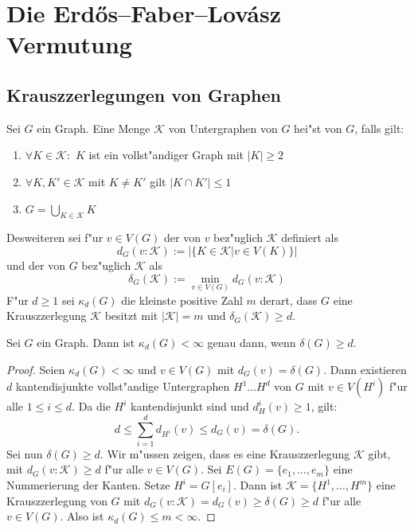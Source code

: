 \section{Die Erd\H{o}s--Faber--Lov\'asz Vermutung}
\label{sec:EFL-Vermutung}


\subsection{Krauszzerlegungen von Graphen}
\label{ssec:Krauszzerlegung}
\begin{definition}
  \label{def:Krauszzerlegung}
  Sei $G$ ein Graph. Eine Menge $\mathcal K$ von Untergraphen von $G$ hei"st  von $G$, falls gilt:
  \begin{enumerate}[label=(\roman*)]
    \item $\forall K \in \mathcal K:$ $K$ ist ein vollst"andiger Graph mit $|K| \geq 2$
    \item $\forall K, K'\in \mathcal K$ mit $K\neq K'$ gilt $|K\cap K'| \leq 1$
    \item $G=\bigcup\limits_{K\in \mathcal K}K$
  \end{enumerate}
  Desweiteren sei f"ur $v\in V(G)$ der  von $v$ bez"uglich $\mathcal K$ definiert als $$d_G(v:\mathcal K) := |\{ K\in\mathcal K| v \in V(K)\}|$$ und der  von $G$ bez"uglich $\mathcal K$ als $$\delta_G(\mathcal K) := \min\limits_{v\in V(G)}d_G(v:\mathcal K)$$ 
  F"ur $d \geq 1$ sei $\kappa_d(G)$ die kleinste positive Zahl $m$ derart, dass $G$ eine Krauszzerlegung $\mathcal K$ besitzt mit $|\mathcal K| = m$ und $\delta_G(\mathcal K) \geq d$.
\end{definition}
\begin{lemma}
  Sei $G$ ein Graph. Dann ist $\kappa_d(G) < \infty$ genau dann, wenn $\delta(G) \geq d$.
  \label{lm:krauszexistenz}
\end{lemma}

\begin{proof}
  Seien $\kappa_d(G) <\infty$ und $v\in V(G)$ mit $d_{G}(v) = \delta(G)$. Dann existieren $d$ kantendisjunkte vollst"andige Untergraphen $H^{1}\dots H^{d}$ von $G$ mit $v\in V(H^{i})$ f"ur alle $1\leq i \leq d$. Da die $H^{i}$ kantendisjunkt sind und $d_H^{i}(v)\geq1$, gilt: 
  \[
    d \leq \sum\limits_{i=1}^{d} d_{H^{i}}(v) \leq d_G(v) = \delta(G). 
  \]
  Sei nun $\delta(G) \geq d$. Wir m"ussen zeigen, dass es eine Krauszzerlegung $\mathcal{K}$ gibt, mit $d_{G}(v:\mathcal{K}) \geq d$ f"ur alle $v\in V(G)$. Sei $E(G)= \{e_1,\dots, e_{m}\}$ eine Nummerierung der Kanten. Setze $H^{i}= G[e_i]$. Dann ist $\mathcal{K} = \{H^{1},\dots, H^{m}\}$ eine Krauszzerlegung von $G$ mit $d_{G}(v:\mathcal{K}) = d_{G}(v) \geq \delta(G) \geq d$ f"ur alle $v\in V(G)$. Also ist $\kappa_d(G)\leq m <\infty$.

\end{proof}

